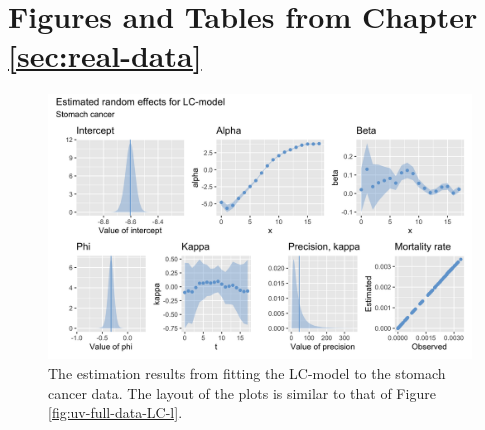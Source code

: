 \setcounter{table}{0}
\renewcommand{\thetable}{A\arabic{table}}
\setcounter{figure}{0}
\renewcommand{\thefigure}{A\arabic{figure}}

\section{Figures and Tables from Chapter \ref{sec:real-data}}

\begin{figure}[h!]
    \centering
    \includegraphics[width=0.85\linewidth]{real-data/real-data-univariate/Figures/uv-full-data-lc-s.png}
    \caption{The estimation results from fitting the LC-model to the stomach cancer data. The layout of the plots is similar to that of Figure \ref{fig:uv-full-data-LC-l}.}
    \label{fig:uv-full-data-LC-s}
\end{figure}


